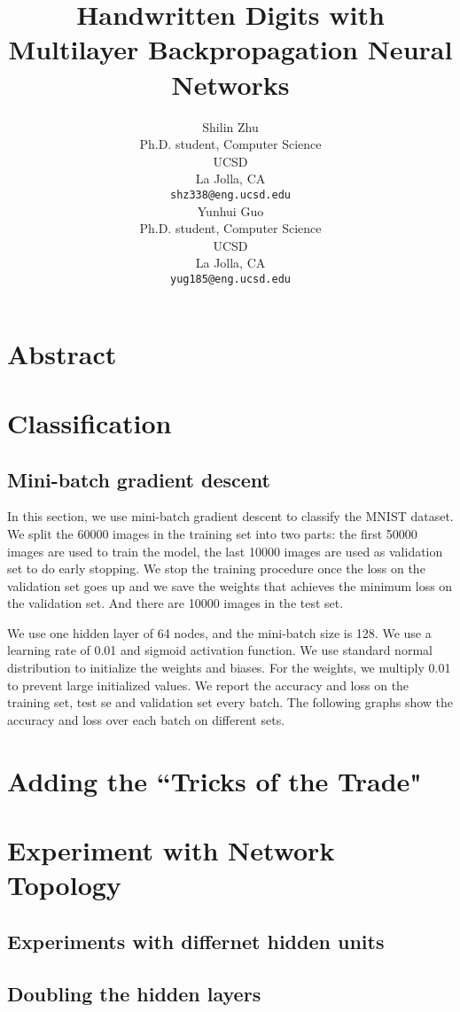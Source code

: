 \documentclass{article} %
\title{Handwritten Digits with Multilayer Backpropagation Neural Networks}
\author{
Shilin Zhu \\
Ph.D. student, Computer Science\\
UCSD\\
La Jolla, CA \\
\texttt{shz338@eng.ucsd.edu} \\
\And
Yunhui Guo\\
Ph.D. student, Computer Science\\
UCSD\\
La Jolla, CA \\
\texttt{yug185@eng.ucsd.edu} \\
}
\begin{document}
\maketitle
\section{Abstract}

\section{Classification}
\subsection{Mini-batch gradient descent}
In this section, we use mini-batch gradient descent to classify the MNIST dataset. We split the 60000 images in the training set into two parts: the first 50000 images are used to train the model, the last 10000 images are used as validation set to do early stopping. We stop the training procedure once the loss on the validation set goes up and we save the weights that achieves the minimum loss on the validation set. And there are 10000 images in the test set.

We use one hidden layer of 64 nodes, and the mini-batch size is 128. We use a learning rate of 0.01 and sigmoid activation function. We use standard normal distribution to initialize the weights and biases. For the weights, we multiply 0.01 to prevent large initialized values. We report the accuracy and loss on the training set, test se and validation set every batch. The following graphs show the accuracy and loss over each batch on different sets.



\section{Adding the “Tricks of the Trade"}


\section{Experiment with Network Topology}

\subsection{Experiments with differnet hidden units}

\subsection{Doubling the hidden layers}
\end{document}
